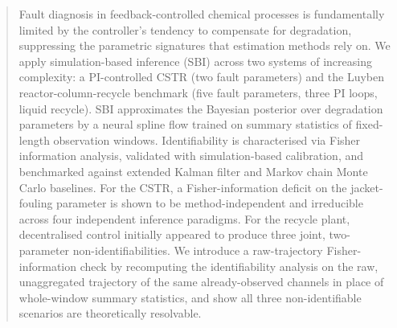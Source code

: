 \documentclass[aps,pre,twocolumn,superscriptaddress]{revtex4-2}
\begin{document}
\begin{abstract}
Fault diagnosis in feedback-controlled chemical processes is fundamentally
limited by the controller's tendency to compensate for degradation,
suppressing the parametric signatures that estimation methods rely on. We apply simulation-based inference
(SBI) across two systems of increasing complexity: a
PI-controlled CSTR (two fault parameters) and the Luyben
reactor-column-recycle benchmark (five fault parameters, three PI loops,
liquid recycle). SBI approximates the Bayesian posterior over degradation parameters by a neural spline flow trained on summary statistics of fixed-length
observation windows.
Identifiability is characterised via Fisher information
analysis, validated with simulation-based calibration, and benchmarked
against extended Kalman filter and Markov chain Monte Carlo baselines.
For the CSTR, a %
Fisher-information deficit on the jacket-fouling parameter is shown to be method-independent and irreducible across four independent inference paradigms. 
For the recycle plant, decentralised control initially appeared
to produce three joint, two-parameter non-identifiabilities. We introduce a
raw-trajectory Fisher-information check by recomputing the
identifiability analysis on the raw, unaggregated trajectory of the same
already-observed channels in place of whole-window summary
statistics, and show all three non-identifiable scenarios are theoretically resolvable.

\end{abstract}
\end{document}

